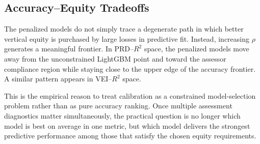 \documentclass[12pt, draft]{article}
\theoremstyle{plain}
\theoremstyle{definition}
\newcommand{\1}{\mathbf{1}}
\begin{document}


\subsection{Accuracy--Equity Tradeoffs}

The penalized models do not simply trace a degenerate path in which better vertical equity is purchased by large losses in predictive fit. Instead, increasing \(\rho\) generates a meaningful frontier. In PRD--\(R^2\) space, the penalized models move away from the unconstrained LightGBM point and toward the assessor compliance region while staying close to the upper edge of the accuracy frontier. A similar pattern appears in VEI--\(R^2\) space.

This is the empirical reason to treat calibration as a constrained model-selection problem rather than as pure accuracy ranking. Once multiple assessment diagnostics matter simultaneously, the practical question is no longer which model is best on average in one metric, but which model delivers the strongest predictive performance among those that satisfy the chosen equity requirements.
\end{document}
